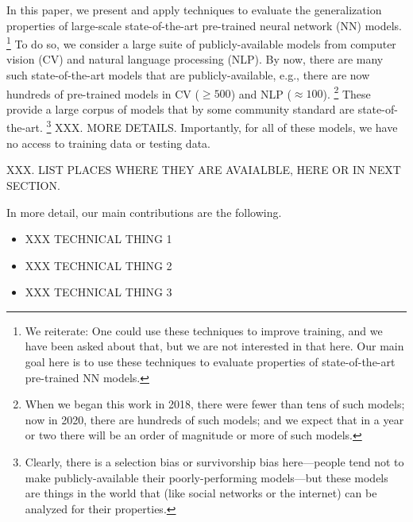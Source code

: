 In this paper, we present and apply techniques to evaluate the generalization properties of large-scale state-of-the-art pre-trained neural network (NN) models.%
\footnote{We reiterate: One could use these techniques to improve training, and we have been asked about that, but we are not interested in that here. Our main goal here is to use these techniques to evaluate properties of state-of-the-art pre-trained NN models.}
To do so, we consider a large suite of publicly-available models from computer vision (CV) and natural language processing (NLP).
%
By now, there are many such state-of-the-art models that are publicly-available, e.g., 
there are now hundreds of pre-trained models in CV ($\ge 500$) and NLP ($\approx 100$).%
\footnote{When we began this work in 2018, there were fewer than tens of such models; now in 2020, there are hundreds of such models; and we expect that in a year or two there will be an order of magnitude or more of such models.}
These provide a large corpus of models that by some community standard are state-of-the-art.%
\footnote{Clearly, there is a selection bias or survivorship bias here---people tend not to make publicly-available their poorly-performing models---but these models are things in the world that (like social networks or the internet) can be analyzed for their properties.}
XXX.  MORE DETAILS.
Importantly, for all of these models, we have no access to training data or testing data.

XXX.  LIST PLACES WHERE THEY ARE AVAIALBLE, HERE OR IN NEXT SECTION.

In more detail, our main contributions are the following.
\begin{itemize}
\item XXX TECHNICAL THING 1
\item XXX TECHNICAL THING 2
\item XXX TECHNICAL THING 3
\end{itemize}



